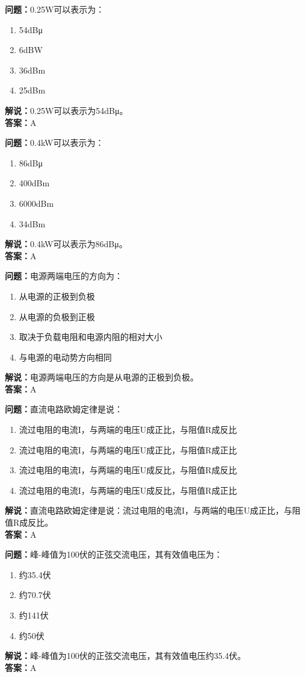 \documentclass[UTF8]{ctexbook}
\begin{document}
\textbf{问题：}0.25W可以表示为：
\begin{enumerate}[label=\Alph*), leftmargin=3em]
  \item 54dBμ
  \item 6dBW
  \item 36dBm
  \item 25dBm
\end{enumerate}
\textbf{解说：}0.25W可以表示为54dBμ。\\
\textbf{答案：}A

\textbf{问题：}0.4kW可以表示为：
\begin{enumerate}[label=\Alph*), leftmargin=3em]
  \item 86dBμ
  \item 400dBm
  \item 6000dBm
  \item 34dBm
\end{enumerate}
\textbf{解说：}0.4kW可以表示为86dBμ。\\
\textbf{答案：}A

\textbf{问题：}电源两端电压的方向为：
\begin{enumerate}[label=\Alph*), leftmargin=3em]
  \item 从电源的正极到负极
  \item 从电源的负极到正极
  \item 取决于负载电阻和电源内阻的相对大小
  \item 与电源的电动势方向相同
\end{enumerate}
\textbf{解说：}电源两端电压的方向是从电源的正极到负极。\\
\textbf{答案：}A

\textbf{问题：}直流电路欧姆定律是说：
\begin{enumerate}[label=\Alph*), leftmargin=3em]
  \item 流过电阻的电流I，与两端的电压U成正比，与阻值R成反比
  \item 流过电阻的电流I，与两端的电压U成正比，与阻值R成正比
  \item 流过电阻的电流I，与两端的电压U成反比，与阻值R成反比
  \item 流过电阻的电流I，与两端的电压U成反比，与阻值R成正比
\end{enumerate}
\textbf{解说：}直流电路欧姆定律是说：流过电阻的电流I，与两端的电压U成正比，与阻值R成反比。\\
\textbf{答案：}A

\textbf{问题：}峰-峰值为100伏的正弦交流电压，其有效值电压为：
\begin{enumerate}[label=\Alph*), leftmargin=3em]
  \item 约35.4伏
  \item 约70.7伏
  \item 约141伏
  \item 约50伏
\end{enumerate}
\textbf{解说：}峰-峰值为100伏的正弦交流电压，其有效值电压约35.4伏。\\
\textbf{答案：}A
\end{document}
